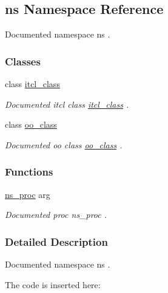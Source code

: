 \hypertarget{namespacens}{}\subsection{ns Namespace Reference}
\label{namespacens}


Documented namespace {\ttfamily ns} .  


\subsubsection*{Classes}
\begin{DoxyCompactItemize}
\item 
class \hyperlink{classns_1_1itcl__class}{itcl\+\_\+class}
\begin{DoxyCompactList}\small\item\em Documented itcl class {\ttfamily \hyperlink{classns_1_1itcl__class}{itcl\+\_\+class}} . \end{DoxyCompactList}\item 
class \hyperlink{classns_1_1oo__class}{oo\+\_\+class}
\begin{DoxyCompactList}\small\item\em Documented oo class {\ttfamily \hyperlink{classns_1_1oo__class}{oo\+\_\+class}} . \end{DoxyCompactList}\end{DoxyCompactItemize}
\subsubsection*{Functions}
\begin{DoxyCompactItemize}
\item 
\hyperlink{namespacens_a1429cbe84d32b17ea4783e5c5c00615b}{ns\+\_\+proc} arg
\begin{DoxyCompactList}\small\item\em Documented proc {\ttfamily ns\+\_\+proc} . \end{DoxyCompactList}\end{DoxyCompactItemize}


\subsubsection{Detailed Description}
Documented namespace {\ttfamily ns} . 

The code is inserted here\+:


